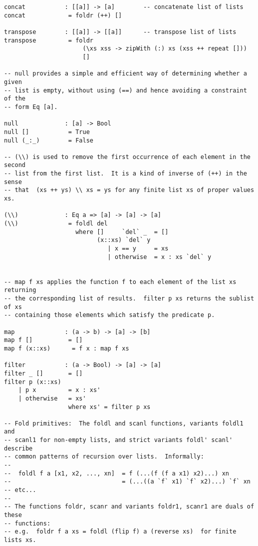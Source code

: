 \begin{verbatim}
concat           : [[a]] -> [a]        -- concatenate list of lists
concat            = foldr (++) []

transpose        : [[a]] -> [[a]]      -- transpose list of lists
transpose         = foldr
                      (\xs xss -> zipWith (:) xs (xss ++ repeat []))
                      []

-- null provides a simple and efficient way of determining whether a given
-- list is empty, without using (==) and hence avoiding a constraint of the
-- form Eq [a].

null             : [a] -> Bool
null []           = True
null (_:_)        = False

-- (\\) is used to remove the first occurrence of each element in the second
-- list from the first list.  It is a kind of inverse of (++) in the sense
-- that  (xs ++ ys) \\ xs = ys for any finite list xs of proper values xs.

(\\)             : Eq a => [a] -> [a] -> [a]
(\\)              = foldl del
                    where []     `del` _  = []
                          (x::xs) `del` y
                             | x == y     = xs
                             | otherwise  = x : xs `del` y


-- map f xs applies the function f to each element of the list xs returning
-- the corresponding list of results.  filter p xs returns the sublist of xs
-- containing those elements which satisfy the predicate p.
 
map              : (a -> b) -> [a] -> [b]
map f []          = []
map f (x::xs)      = f x : map f xs

filter           : (a -> Bool) -> [a] -> [a]
filter _ []       = []
filter p (x::xs)
    | p x         = x : xs'
    | otherwise   = xs'
                  where xs' = filter p xs

-- Fold primitives:  The foldl and scanl functions, variants foldl1 and
-- scanl1 for non-empty lists, and strict variants foldl' scanl' describe
-- common patterns of recursion over lists.  Informally:
--
--  foldl f a [x1, x2, ..., xn]  = f (...(f (f a x1) x2)...) xn
--                               = (...((a `f` x1) `f` x2)...) `f` xn
-- etc...
--
-- The functions foldr, scanr and variants foldr1, scanr1 are duals of these
-- functions:
-- e.g.  foldr f a xs = foldl (flip f) a (reverse xs)  for finite lists xs.


\end{verbatim}
